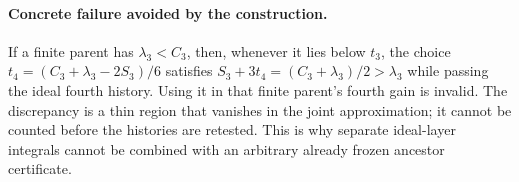 \paragraph{Concrete failure avoided by the construction.}
If a finite parent has $\lambda_3<C_3$, then, whenever it lies below
$t_3$, the choice
$t_4=(C_3+\lambda_3-2S_3)/6$ satisfies
$S_3+3t_4=(C_3+\lambda_3)/2>\lambda_3$ while passing the ideal
fourth history. Using it in that finite parent's fourth gain is
invalid. The discrepancy is a thin region that vanishes in the
joint approximation; it cannot be counted before the histories are
retested. This is why separate ideal-layer integrals cannot be
combined with an arbitrary already frozen ancestor certificate.
